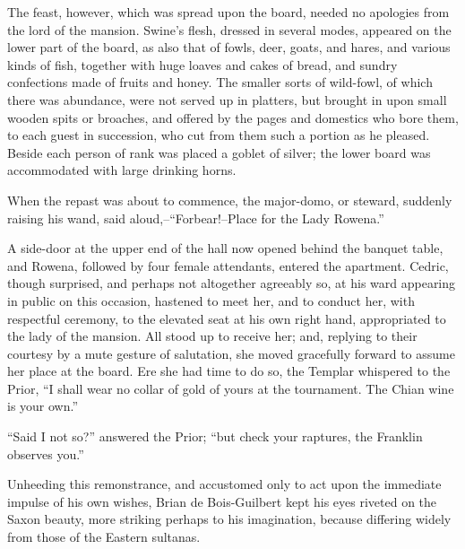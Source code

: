 The feast, however, which was spread upon the board, needed no apologies
from the lord of the mansion. Swine's flesh, dressed in several modes,
appeared on the lower part of the board, as also that of fowls, deer,
goats, and hares, and various kinds of fish, together with huge loaves
and cakes of bread, and sundry confections made of fruits and honey. The
smaller sorts of wild-fowl, of which there was abundance, were not
served up in platters, but brought in upon small wooden spits or
broaches, and offered by the pages and domestics who bore them, to each
guest in succession, who cut from them such a portion as he pleased.
Beside each person of rank was placed a goblet of silver; the lower
board was accommodated with large drinking horns.

When the repast was about to commence, the major-domo, or steward,
suddenly raising his wand, said aloud,--``Forbear!--Place for the Lady
Rowena.''

A side-door at the upper end of the hall now opened behind the banquet
table, and Rowena, followed by four female attendants, entered the
apartment. Cedric, though surprised, and perhaps not altogether
agreeably so, at his ward appearing in public on this occasion, hastened
to meet her, and to conduct her, with respectful ceremony, to the
elevated seat at his own right hand, appropriated to the lady of the
mansion. All stood up to receive her; and, replying to their courtesy by
a mute gesture of salutation, she moved gracefully forward to assume her
place at the board. Ere she had time to do so, the Templar whispered to
the Prior, ``I shall wear no collar of gold of yours at the tournament.
The Chian wine is your own.''

``Said I not so?'' answered the Prior; ``but check your raptures, the
Franklin observes you.''

Unheeding this remonstrance, and accustomed only to act upon the
immediate impulse of his own wishes, Brian de Bois-Guilbert kept his
eyes riveted on the Saxon beauty, more striking perhaps to his
imagination, because differing widely from those of the Eastern
sultanas.

